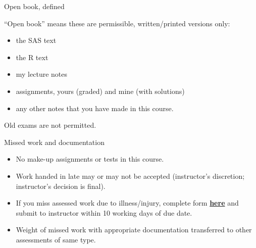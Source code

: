 \documentclass[
  ignorenonframetext,
]{beamer}
\providecommand{\tightlist}{%
  \setlength{\itemsep}{0pt}\setlength{\parskip}{0pt}}
\begin{document}
\begin{frame}{Open book, defined}
\protect\hypertarget{open-book-defined}{}

``Open book'' means these are permissible, written/printed versions
only:

\begin{itemize}
\tightlist
\item
  the SAS text
\item
  the R text
\item
  my lecture notes
\item
  assignments, yours (graded) and mine (with solutions)
\item
  any other notes that you have made in this course.
\end{itemize}

Old exams are not permitted.

\end{frame}

\begin{frame}{Missed work and documentation}
\protect\hypertarget{missed-work-and-documentation}{}

\begin{itemize}
\tightlist
\item
  No make-up assignments or tests in this course.
\item
  Work handed in late may or may not be accepted (instructor's
  discretion; instructor's decision is final).
\item
  If you miss assessed work due to illness/injury, complete form
  \href{http://www.illnessverification.utoronto.ca/}{\textbf{here}} and
  submit to instructor within 10 working days of due date.
\item
  Weight of missed work with appropriate documentation transferred to
  other assessments of same type.
\end{itemize}

\end{frame}
\end{document}
